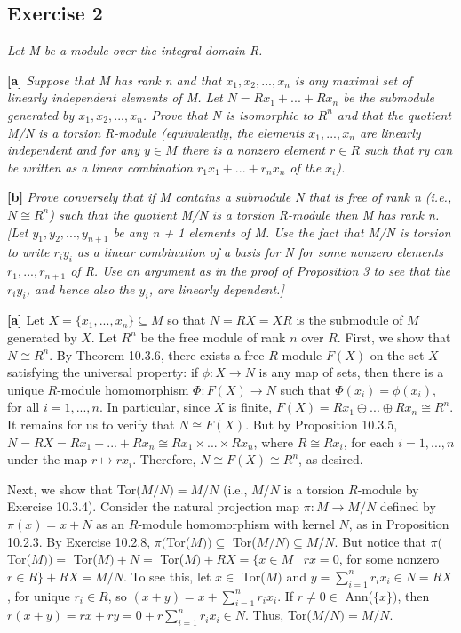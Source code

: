 \subsection*{Exercise 2}
\begin{framed}
\textit{Let M be a module over the integral domain R.}

\textbf{[a]} \textit{Suppose that M has rank n and that $x_1, x_2, ... ,x_n$ is any maximal set of linearly independent elements of M. Let $N = Rx_1 + ... + Rx_n$ be the submodule generated by $x_1, x_2, ... , x_n$. Prove that N is isomorphic to $R^n$ and that the quotient M/N is a torsion R-module (equivalently, the elements $x_1, ..., x_n$ are linearly independent and for any $y \in M$ there is a nonzero element $r \in R$ such that ry can be written as a linear combination $r_1x_1 + ... + r_nx_n$ of the $x_i$).}

\textbf{[b]} \textit{Prove conversely that if M contains a submodule N that is free of rank n (i.e., $N \cong R^n$) such that the quotient M/N is a torsion R-module then M has rank n. [Let $y_1, y_2, ..., y_{n+1}$ be any n + 1 elements of M. Use the fact that M/N is torsion to write $r_iy_i$ as a linear combination of a basis for N for some nonzero elements $r_1, ..., r_{n+1}$ of R. Use an argument as in the proof of Proposition 3 to see that the $r_iy_i$, and hence also the $y_i$, are linearly dependent.]}
\end{framed}

\textbf{[a]} Let $X = \{x_1, ..., x_n\} \subseteq M$ so that $N = RX = XR$ is the submodule of $M$ generated by $X$. Let $R^n$ be the free module of rank $n$ over $R$. First, we show that $N \cong R^n$. By Theorem 10.3.6, there exists a free $R$-module $F(X)$ on the set $X$ satisfying the universal property: if $\phi: X \rightarrow N$ is any map of sets, then there is a unique $R$-module homomorphism $\Phi: F(X) \rightarrow N$ such that $\Phi(x_i) = \phi(x_i)$, for all $i = 1,...,n$. In particular, since $X$ is finite, $F(X) = Rx_1 \oplus ... \oplus Rx_n \cong R^n$. It remains for us to verify that $N \cong F(X)$. But by Proposition 10.3.5, $N = RX = Rx_1 + ... + Rx_n \cong Rx_1 \times ... \times Rx_n$, where $R \cong Rx_i$, for each $i = 1,...,n$ under the map $r \mapsto rx_i$. Therefore, $N \cong F(X) \cong R^n$, as desired.

Next, we show that Tor($M/N) = M/N$ (i.e., $M/N$ is a torsion $R$-module by Exercise 10.3.4). Consider the natural projection map $\pi: M \rightarrow M/N$ defined by $\pi(x) = x + N$ as an $R$-module homomorphism with kernel $N$, as in Proposition 10.2.3. By Exercise 10.2.8, $\pi($Tor($M)) \subseteq$ Tor($M/N) \subseteq M/N$. But notice that $\pi($Tor($M)) =$ Tor($M) + N =$ Tor($M) + RX = \{x \in M \mid rx = 0$, for some nonzero $r \in R\} + RX = M/N$. To see this, let $x \in$ Tor($M)$ and $y = \sum_{i=1}^n r_ix_i \in N = RX$, for unique $r_i \in R$, so $(x + y) = x + \sum_{i=1}^nr_ix_i$. If $r \not= 0 \in$ Ann($\{x\})$, then $r(x + y) = rx + ry = 0 + r\sum_{i=1}^nr_ix_i \in N$. Thus, Tor($M/N) = M/N.$

